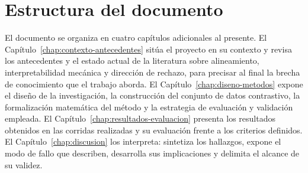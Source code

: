 \section{Estructura del documento}
\label{sec:estructura}

El documento se organiza en cuatro capítulos adicionales al presente. El
Capítulo~\ref{chap:contexto-antecedentes} sitúa el proyecto en su contexto y
revisa los antecedentes y el estado actual de la literatura sobre alineamiento,
interpretabilidad mecánica y dirección de rechazo, para precisar al final la
brecha de conocimiento que el trabajo aborda. El
Capítulo~\ref{chap:diseno-metodos} expone el diseño de la investigación, la
construcción del conjunto de datos contrastivo, la formalización matemática del
método y la estrategia de evaluación y validación empleada. El
Capítulo~\ref{chap:resultados-evaluacion} presenta los resultados obtenidos en
las corridas realizadas y su evaluación frente a los criterios definidos. El
Capítulo~\ref{chap:discusion} los interpreta: sintetiza los hallazgos, expone
el modo de fallo que describen, desarrolla sus implicaciones y delimita el
alcance de su validez.
